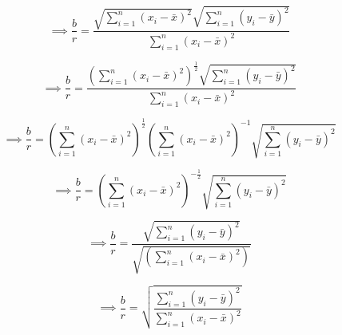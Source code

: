 \documentclass[a4paper,11pt]{article}
\begin{document}
\begin{equation}
\implies
\frac{b}{r} = 
  \frac
    {
      \sqrt{\sum_{i=1}^n \left(x_i - \bar{x} \right)^2}
      \sqrt{\sum_{i=1}^n \left(y_i - \bar{y} \right)^2 } 
    }
    {
      \sum_{i=1}^n \left(x_i - \bar{x} \right)^2 
    }
\end{equation}

\begin{equation}
\implies
\frac{b}{r} = 
  \frac
    {
      (\sum_{i=1}^n \left(x_i - \bar{x} \right)^2)^\frac{1}{2}
      \sqrt{\sum_{i=1}^n \left(y_i - \bar{y} \right)^2 } 
    }
    {
      \sum_{i=1}^n \left(x_i - \bar{x} \right)^2 
    }
\end{equation}

\begin{equation}
\implies
\frac{b}{r} = 
\left( \sum_{i=1}^n \left(x_i - \bar{x} \right)^2 \right) ^ \frac{1}{2}
\left( \sum_{i=1}^n \left(x_i - \bar{x} \right)^2 \right) ^ {-1}
\sqrt{\sum_{i=1}^n \left(y_i - \bar{y} \right)^2 }
\end{equation}

\begin{equation}
\implies
\frac{b}{r} = 
\left( \sum_{i=1}^n \left(x_i - \bar{x} \right)^2 \right) ^ {-\frac{1}{2}}
\sqrt{\sum_{i=1}^n \left(y_i - \bar{y} \right)^2 }
\end{equation}


\begin{equation}
\implies
\frac{b}{r} = 
\frac
{\sqrt{\sum_{i=1}^n \left(y_i - \bar{y} \right)^2 }}
{\sqrt{\left( \sum_{i=1}^n \left(x_i - \bar{x} \right)^2 \right)} }
\end{equation}


\begin{equation}
\implies
\frac{b}{r} = 
\sqrt{
  \frac
    {\sum_{i=1}^n \left(y_i - \bar{y} \right)^2}
    {\sum_{i=1}^n \left(x_i - \bar{x} \right)^2}
  }
\end{equation}
\end{document}
